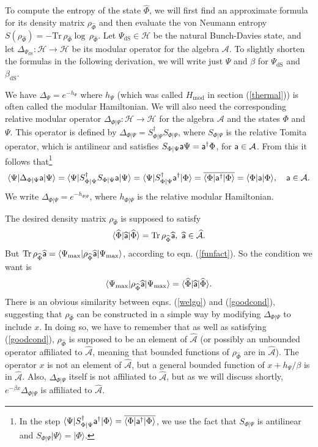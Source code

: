 \documentclass[11pt,a4paper]{article}
\def\a{{\sf a}}
\def\max{{\mathrm{max}}}
\def\mod{{\mathrm{mod}}}
\def\be{\begin{equation}}
\def\ee{\end{equation}}
\def\h{\widehat}
\def\A{{\mathcal A}}
\def\h{\widehat}
\def\H{{\mathcal H}}
\def\dS{{\mathrm{dS}}}
\def\la{\langle}
\def\ra{\rangle}
\def\Tr{{\mathrm{Tr}}}
\begin{document}
 
  
  To compute the entropy of the state $\h\Phi$, we will first find an approximate formula for its density matrix $\rho_{\h\Phi}$ and then evaluate the von Neumann
  entropy $S(\rho_{\h\Phi})=-\Tr\,\rho_{\h\Phi}\log\,\rho_{\h\Phi}$.   
 Let $\Psi_\dS\in\H$ be the natural Bunch-Davies state, and let $\Delta_{\Psi_\dS}:\H\to\H$
 be its modular operator for the algebra $\A$.   To slightly shorten the formulas
in the following derivation, we will write just $\Psi$ and $\beta$ for $\Psi_\dS$ and $\beta_\dS$.
 
 
    We have $\Delta_{\Psi}=e^{-h_{\Psi}}$ where $h_{\Psi}$ (which was called $H_\mod $ in section 
 (\ref{thermal})) is often called the modular Hamiltonian.
 We will also need the corresponding relative modular operator 
 $\Delta_{\Phi|\Psi}:\H\to\H$ for the algebra $\A$ and the states $\Phi$ and $\Psi$.   
 This operator is defined by $\Delta_{\Phi|\Psi}=S^\dagger_{\Phi|\Psi} S_{\Phi|\Psi}$,
 where $S_{\Phi|\Psi}$ is the relative Tomita operator, which is antilinear and  satisfies $S_{\Phi|\Psi}\a\Psi=\a^\dagger\Phi$, for $\a\in\A$.
 From this it follows that\footnote{In the step $ \la\Psi|S^\dagger_{\Phi|\Psi}\a^\dagger|\Phi\ra= 
  \overline{\la\Phi|\a^\dagger|\Phi\ra}$, we use the fact that $S_{\Phi|\Psi}$ is antilinear and $S_{\Phi|\Psi}|\Psi\ra=|\Phi\ra.$}
  \be\label{welgo}\la\Psi|\Delta_{\Phi|\Psi}\a|\Psi\ra =\la\Psi|S_{\Phi|\Psi}^\dagger S_{\Phi|\Psi}\a|\Psi \ra= \la\Psi|S^\dagger_{\Phi|\Psi}\a^\dagger|\Phi\ra= 
  \overline{\la\Phi|\a^\dagger|\Phi\ra}=\la\Phi| \a|\Phi\ra,~~~\a\in\A. \ee    
We write $\Delta_{\Phi|\Psi}=e^{-h_{\Phi|\Psi}}$, where $h_{\Phi|\Psi}$ is the relative modular Hamiltonian.   

The desired density matrix $\rho_{\h\Phi}$ is supposed to satisfy \be\label{supposed} \la\h\Phi|\h\a|\h\Phi\ra=\Tr\,\rho_{\h\Phi}\h\a, ~\h\a\in\h\A.\ee
   But $\Tr\,\rho_{\h\Phi}\h\a
=\la\Psi_\max|\rho_{\h\Phi}\h\a|\Psi_\max\ra$, according to eqn. (\ref{funfact}).   So the condition we want is
\be\label{goodcond} \la\Psi_\max|\rho_{\h\Phi} \h\a|\Psi_\max\ra =\la\h\Phi|\h\a|\h\Phi\ra. \ee
There is an obvious similarity between  eqns. (\ref{welgo}) and (\ref{goodcond}), suggesting that $\rho_{\h\Phi}$ can be constructed in a simple way by modifying
$\Delta_{\Phi|\Psi}$ to include $x$.   In doing so, we have to remember that as well as satisfying (\ref{goodcond}), $\rho_{\h\Phi}$ is supposed to be an element
of $\h\A$ (or possibly an unbounded operator affiliated to $\h\A$, meaning that bounded functions of $\rho_{\h\Phi}$ are in $\h\A$).   The operator $x$ is not an element
of $\h\A$, but a general bounded function of $x+h_\Psi/\beta$ is in $\h\A$.   Also, $\Delta_{\Phi|\Psi}$ itself is not affiliated to $\h\A$, but as we will discuss
shortly, $e^{-\beta x}\Delta_{\Phi|\Psi}$ is affiliated to $\h\A$.
\end{document}
